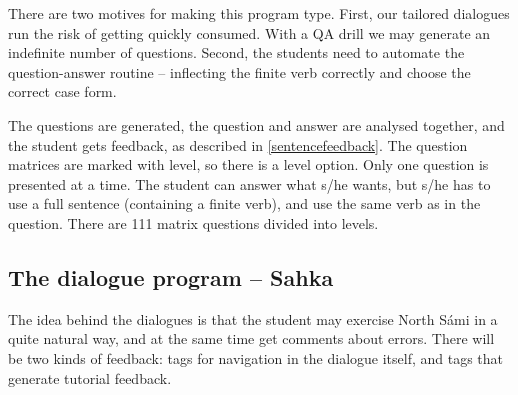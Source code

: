 \documentclass[11pt]{article}
\begin{document}
There are two motives for making this program type. First, our tailored dialogues 
run the risk of getting quickly consumed. With a QA drill we may generate an indefinite number of questions. Second, the students need to automate the question-answer routine -- inflecting the finite verb correctly and choose the correct case form.

The questions are generated, the question and answer are analysed together, and the student gets feedback, as described in \ref{sentencefeedback}. The question matrices are marked with level, so there is a level option. Only one question is presented at a time. The student can answer what s/he wants, but s/he has to use a full sentence (containing a finite verb), and use the same verb as in the question. There are 111 matrix questions divided into levels.



\subsection{The dialogue program -- Sahka}
The idea behind the dialogues is that the student may exercise North Sámi in a quite natural way, and at the same time get comments about errors. There will be two kinds of feedback: tags for navigation in the dialogue itself, and tags that generate tutorial feedback.
\end{document}
